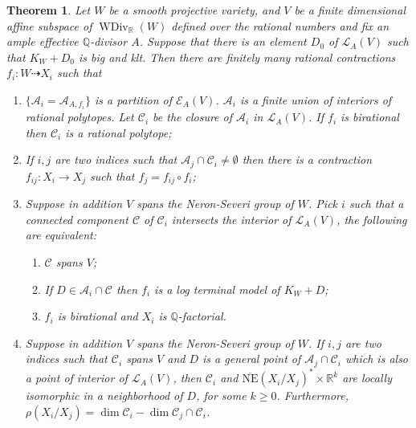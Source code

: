 \documentclass[11pt]{amsart}
\newtheorem{thm}[defn]{Theorem}
\begin{document}
\begin{thm}\label{mapbetweenAM}
  \cite[Theorem 3.3]{haconSarkisovProgram2012} Let $W$ be a smooth projective   variety, and  $ V $ be a finite dimensional affine subspace of $ \operatorname{WDiv}_{\mathbb{R}}(W) $ defined over the rational numbers and fix an ample effective $\mathbb{Q}$-divisor $A$. Suppose that there is an element $D_{0}$ of $\mathcal{L}_{A}(V)$ such that $K_{W}+D_{0}$ is big and klt. Then there are finitely many rational contractions $ f_i:W\dashrightarrow X_i $ such that
  \begin{enumerate}
    \item $ \{\mathcal{A}_i=\mathcal{A}_{A,f_i}\} $ is a partition of $ \mathcal{E}_{A}(V) $. $ \mathcal{A}_{i} $ is a finite union of interiors of rational polytopes.  Let $\mathcal{C}_{i}$ be the closure of $\mathcal{A}_{i}$ in $\mathcal{L}_{A}(V)$. If $ f_i $ is birational then $ \mathcal{C}_i$ is a rational polytope;
    \item If $ i,j $ are two indices such that $ \mathcal{A}_j\cap \mathcal{C}_i\neq \emptyset $ then there is a contraction $ f_{ij}:X_i\to X_j $ such that $ f_j=f_{ij}\circ f_i $;
    \item Suppose in addition $ V $ spans the Neron-Severi group of $W$. Pick $ i $ such that a connected component $ \mathcal{C} $ of $ \mathcal{C}_i $ intersects the interior of $ \mathcal{L}_A(V) $, the following are equivalent:
          \begin{enumerate}
            \item $ \mathcal{C} $ spans $ V $;
            \item If $ D\in \mathcal{A}_i\cap \mathcal{C} $ then $ f_i $ is a log terminal model of $ K_W+D $;
            \item $ f_i $ is birational and $ X_i $ is $ \mathbb{Q} $-factorial.
          \end{enumerate}
    \item Suppose in addition $ V $ spans the Neron-Severi group of $W$. If $ i,j $ are two indices such that $ \mathcal{C}_i $ spans $ V $ and $ D $ is a general point of $ \mathcal{A}_j\cap \mathcal{C}_i $ which is also a point of interior of $ \mathcal{L}_A(V) $, then $ \mathcal{C}_i $ and $ \overline{\mathrm{NE}}(X_i/X_j)^*\times \mathbb{R}^k $ are locally isomorphic in a neighborhood of $D$,  for some $ k\geqslant 0 $. Furthermore, $ \rho(X_i/X_j)=\dim  \mathcal{C}_i-\dim \mathcal{C}_j\cap \mathcal{C}_i   $.
  \end{enumerate}
\end{thm}
\end{document}
